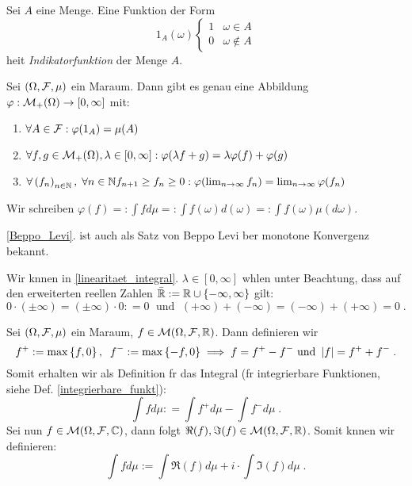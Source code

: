 \begin{definition}
	Sei $A$ eine Menge. Eine Funktion der Form
	\[1_A(\omega)\begin{cases}1 & \omega \in A \\ 0 & \omega \not\in A\end{cases}\]
	hei\s t \textit{Indikatorfunktion} der Menge $A$.
\end{definition}
\begin{theorem}
	Sei \((\Omega, \mathcal{F}, \mu)\) ein Ma\s raum. Dann gibt es genau eine Abbildung \(\varphi: \mathcal{M}_+(\Omega) \to [0,\infty]\) mit:
	\begin{enumerate}
		\item \(\forall A \in \mathcal{F}: \varphi(1_A) = \mu(A)\)
		\item \(\forall f, g \in \mathcal{M}_+(\Omega), \lambda \in [0,\infty]: \varphi(\lambda f + g) = \lambda\varphi(f) + \varphi(g)\) \label{linearitaet_integral}
		\item \(\forall \left (f_n\right )_{n\in \mathbb{N}},\; \forall n \in \mathbb{N} f_{n+1} \geq f_{n} \geq 0: \varphi(\lim_{n \to \infty} f_n) = \lim_{n \to\infty} \varphi(f_n)\) \label{Beppo_Levi}
	\end{enumerate}
	Wir schreiben \(\varphi(f)  =: \int f d\mu =: \int f(\omega) d(\omega) =:\int f(\omega) \mu(d \omega)\).
\end{theorem}
\begin{rem}
	\ref{Beppo_Levi}. ist auch als Satz von Beppo Levi \us ber monotone Konvergenz bekannt.
\end{rem}
\begin{rem}
	Wir k\os nnen in \ref{linearitaet_integral}. \(\lambda \in [0, \infty]\) w\as hlen unter Beachtung, dass auf den erweiterten reellen Zahlen \(\bar{\mathbb{R}} := \mathbb{R} \cup \left\{-\infty, \infty\right\}\) gilt:
	\[0\cdot (\pm \infty) = (\pm \infty) \cdot 0 : = 0 \;\text{ und }\; (+\infty) + (-\infty) = (-\infty) + (+\infty) = 0\;.\]
\end{rem}
\begin{definition}
	Sei \((\Omega, \mathcal{F}, \mu)\) ein Ma\s raum, \(f\in \mathcal{M}(\Omega, \mathcal{F}, \mathbb{R})\). Dann definieren wir
	\[f^+ := \max\left\{f,0\right\}, \;\; f^- := \max\left\{-f,0\right\} \implies f = f^+ - f^- \text{ und } \left\lvert f \right\rvert = f^+ + f^-\;.\]
	Somit erhalten wir als Definition f\us r das Integral (f\us r integrierbare Funktionen, siehe Def. \ref{integrierbare_funkt}):
	\[\int f d\mu : = \int f^+ d\mu - \int f^- d\mu\;.\]
	Sei nun \(f\in \mathcal{M}(\Omega, \mathcal{F},\mathbb{C})\), dann folgt \(\Re(f), \Im(f) \in \mathcal{M} (\Omega, \mathcal{F}, \mathbb{R})\). Somit k\os nnen wir definieren:
	\[\int f d\mu := \int \Re(f) d\mu + i \cdot \int \Im(f) d\mu\;.\]
\end{definition}
